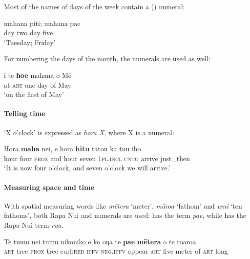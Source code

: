 Most of the names of days of the week contain a () numeral:

\ea\label{ex:4.16}
\gll mahana piti; mahana pae \\
day two day five \\

\glt
‘Tuesday; Friday’
\z

For numbering the days of the month, the  numerals are used as well:

\ea\label{ex:4.17}
\gll {\ꞌ}i te \textbf{ho{\ꞌ}e} mahana o Mē \\
at \textsc{art} one day of May \\

\glt 
‘on the first of May’ \textstyleExampleref{[R231.045]}  
\z

\paragraph[Telling time]{Telling time}\label{sec:4.3.1.1.2}

‘X o’clock’ is expressed as \textit{hora X}, where X is a  numeral:

\ea\label{ex:4.18}
\gll Hora \textbf{maha} nei, {\ꞌ}e hora \textbf{hitu} tātou ka tu{\ꞌ}u iho. \\
hour four \textsc{prox} and hour seven \textsc{1pl.incl} \textsc{cntg} arrive just\_then \\

\glt 
‘It is now four o’clock, and seven o’clock we will arrive.’ \textstyleExampleref{[R210.198]} 
\z

\paragraph{Measuring space and time}\label{sec:4.3.1.1.3}

With spatial measuring words like \textit{mētera} ‘meter’, \textit{māroa} ‘fathom’ and \textit{{\ꞌ}umi} ‘ten fathoms’, both Rapa Nui and  numerals are used:  has the  term \textit{pae}, while  has the Rapa Nui term \textit{rua}.

\ea\label{ex:4.19}
\gll Te tumu nei tumu nikoniko e ko oŋa te \textbf{pae} \textbf{mētera} o te roaroa. \\
\textsc{art} tree \textsc{prox} tree curl:\textsc{red} \textsc{ipfv} \textsc{neg.ipfv} appear \textsc{art} five meter of \textsc{art} long \\

